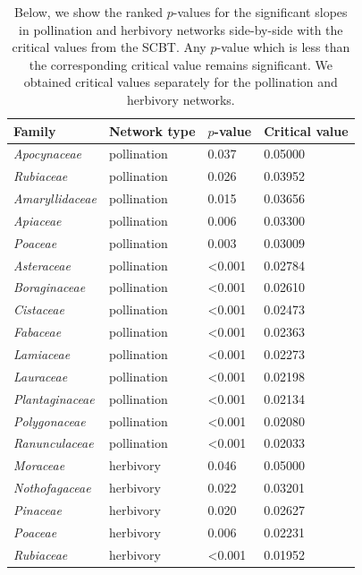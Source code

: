 \documentclass[12pt]{article}
\begin{document}
\begin{spacing}{1.5}
    \begin{table}[h!]
        \caption{
          Below, we show the ranked $p$-values for the significant slopes in pollination and herbivory networks side-by-side with the critical values from the SCBT. Any $p$-value which is less than the corresponding critical value remains significant. We obtained critical values separately for the pollination and herbivory networks. }
          \label{SCBT_values}
        \begin{tabular}{l | l | l l |}
        Family & Network type & $p$-value & Critical value \\
        \hline
        \emph{Apocynaceae}      &   pollination &   0.037   &   0.05000 \\
        \emph{Rubiaceae}  &   pollination &   0.026   &   0.03952 \\
        \emph{Amaryllidaceae}   &   pollination &   0.015   &   0.03656 \\
        \emph{Apiaceae}     &   pollination &   0.006   &   0.03300 \\
        \emph{Poaceae}    &   pollination &   0.003   &   0.03009 \\
        \emph{Asteraceae}      &   pollination &   \textless0.001   &   0.02784 \\
        \emph{Boraginaceae}     &   pollination &   \textless0.001   &   0.02610 \\
        \emph{Cistaceae}    &   pollination &   \textless0.001   &   0.02473 \\
        \emph{Fabaceae}    &   pollination &   \textless0.001   &   0.02363 \\
        \emph{Lamiaceae}    &   pollination &   \textless0.001   &   0.02273 \\
        \emph{Lauraceae}    &   pollination &   \textless0.001   &   0.02198 \\
        \emph{Plantaginaceae}  &   pollination &   \textless0.001   &   0.02134 \\
        \emph{Polygonaceae}    &   pollination &   \textless0.001   &   0.02080 \\
        \emph{Ranunculaceae}   &   pollination &   \textless0.001   &   0.02033 \\
        \hline
        \emph{Moraceae}         &herbivory&  0.046 & 0.05000 \\
        \emph{Nothofagaceae}    &herbivory&  0.022 & 0.03201 \\
        \emph{Pinaceae}         &herbivory&  0.020 & 0.02627 \\
        \emph{Poaceae}          &herbivory&  0.006 & 0.02231 \\
        \emph{Rubiaceae}        &herbivory&  \textless0.001 & 0.01952 \\
        \hline
     \end{tabular}
    \end{table}

\end{spacing}

\clearpage

\newpage

\renewcommand*{\bibfont}{\raggedright}

\end{document}
